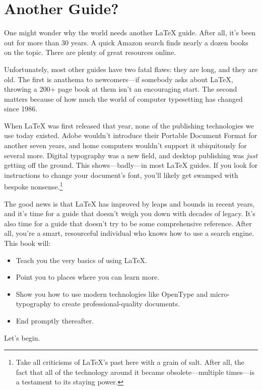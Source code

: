 \chapter{Another Guide?}

One might wonder why the world needs another \LaTeX{} guide.
After all, it's been out for more than 30 years.
A quick Amazon search finds nearly a dozen books on the topic.
There are plenty of great resources online.

Unfortunately, most other guides have two fatal flaws: they are long,
and they are old.
The first is anathema to newcomers---if somebody asks about \LaTeX{},
throwing a 200+ page book at them isn't an encouraging start.
The second matters because of how much the world of computer typesetting has
changed since 1986.

When \LaTeX{} was first released that year, none of the publishing technologies
we use today existed.
Adobe wouldn't introduce their Portable Document Format for another seven years,
and home computers wouldn't support it ubiquitously for several more.
Digital typography was a new field, and desktop publishing was \emph{just}
getting off the ground.\punckern{}
This shows---badly---in most \LaTeX{} guides.
If you look for instructions to change your document's font,
you'll likely get swamped with bespoke nonsense.\punckern\footnote{%
Take all criticisms of \LaTeX's past here with a grain of
salt. After all, the fact that all of the technology around it became
obsolete---multiple times---is a testament to its staying power.}

The good news is that  \LaTeX{} has improved by leaps and bounds in recent years,
and it's time for a guide that doesn't weigh you down with decades of legacy.
It's also time for a guide that doesn't try to be some comprehensive reference.
After all, you're a smart, resourceful individual who knows how to use a search
engine.
This book will:
\begin{itemize}
\item Teach you the very basics of using \LaTeX.
\item Point you to places where you can learn more.
\item Show you how to use modern technologies like OpenType and micro-typography
    to create professional-quality documents.
\item End promptly thereafter.
\end{itemize}
Let's begin.
